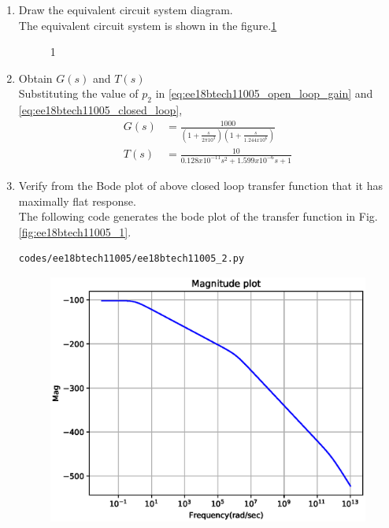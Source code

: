 \begin{enumerate}[label=\arabic*.,ref=\theenumi]
\item  Draw the equivalent circuit system diagram.\\
\solution
The equivalent circuit system is shown in the figure.\ref{fig:equivalent_system}
\begin{figure}[!hbt]
	\begin{center}
			\resizebox{\columnwidth}{!}{}
	\end{center}
\caption{1}
\label{fig:equivalent_system}
\end{figure}
\item Obtain $G(s)$ and $T(s)$
\\
\solution Substituting the value of $p_2$ in  \eqref{eq:ee18btech11005_open_loop_gain} and \eqref{eq:ee18btech11005_closed_loop},
\begin{align}
     G(s) &= \frac{1000}{(1+\frac{s}{2\pi10^3})(1+\frac{s}{1.244x10^6})}
    \label{eq:ee18btech11005_G(s)}
\\
    T(s) &= \frac{10}{0.128x10^{-11}s^2+1.599x10^{-6}s+1}
    \label{eq:ee18btech11005_Transfer_func}
\end{align}
\item Verify from the Bode plot of above closed loop transfer function that it has maximally flat response.
\\
\solution The following code generates the bode plot of the transfer function in Fig. \ref{fig:ee18btech11005_1}.
\begin{lstlisting}
codes/ee18btech11005/ee18btech11005_2.py
\end{lstlisting}
\begin{figure}[!ht]
\centering
\includegraphics[width=\columnwidth]{./figs/ee18btech11005/ee18btech11005_1.eps}

\end{figure}
\end{enumerate}
